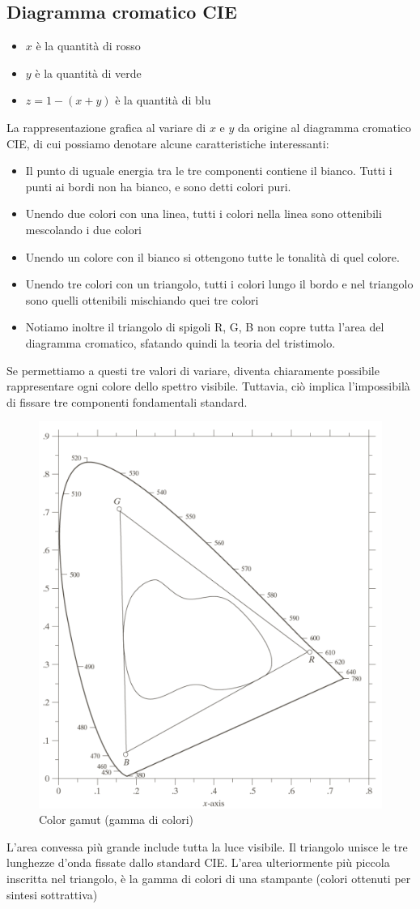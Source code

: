 \documentclass{report}
\begin{document}
	\subsection{Diagramma cromatico CIE}
	\begin{itemize}
		\item $x$ è la quantità di rosso
		\item $y$ è la quantità di verde
		\item $z = 1-(x+y)$ è la quantità di blu
	\end{itemize}
	La rappresentazione grafica al variare di $x$ e $y$ da origine al diagramma cromatico CIE, di cui possiamo denotare alcune caratteristiche interessanti:
	\begin{itemize}
		\item Il punto di uguale energia tra le tre componenti contiene il bianco. Tutti i punti ai bordi non ha bianco, e sono detti colori puri.
		\item Unendo due colori con una linea, tutti i colori nella linea sono ottenibili mescolando i due colori
		\item Unendo un colore con il bianco si ottengono tutte le tonalità di quel colore.
		\item Unendo tre colori con un triangolo, tutti i colori lungo il bordo e nel triangolo sono quelli ottenibili mischiando quei tre colori
		\item Notiamo inoltre il triangolo di spigoli R, G, B non copre tutta l'area del diagramma cromatico, sfatando quindi la teoria del tristimolo.
	\end{itemize}
	Se permettiamo a questi tre valori di variare, diventa chiaramente possibile rappresentare ogni colore dello spettro visibile. Tuttavia, ciò implica l'impossibilà di fissare tre componenti fondamentali standard.
		
	\begin{figure}[htp]
		\centering
		\includegraphics[width=0.3\linewidth]{gamut.png}
		\caption{Color gamut (gamma di colori)}
	\end{figure}
	L'area convessa più grande include tutta la luce visibile. Il triangolo unisce le tre lunghezze d'onda fissate dallo standard CIE. L'area ulteriormente più piccola inscritta nel triangolo, è la gamma di colori di una stampante (colori ottenuti per sintesi sottrattiva)
	\newpage
\end{document}
